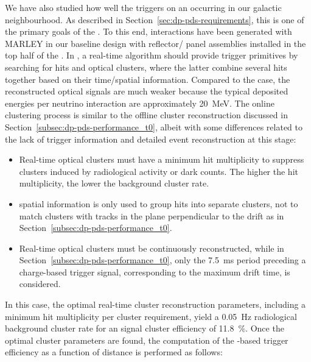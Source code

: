 We have also studied how well the   triggers on an  occurring in our galactic neighbourhood. As described in Section~\ref{sec:dp-pds-requirements}, this is one of the primary goals of the . To this end,  \nue {} interactions have been generated with MARLEY \cite{marley} in our baseline  design with reflector/ panel assemblies installed in the top half of the . In , a real-time algorithm should provide trigger primitives by searching for  hits and optical clusters, where the latter combine several hits together based on their time/spatial information. Compared to the  case, the reconstructed optical signals are much weaker because the typical deposited energies per  neutrino interaction are approximately \SI{20}{\MeV}. The online clustering process is similar to the offline cluster reconstruction discussed in Section~\ref{subsec:dp-pds-performance_t0}, albeit with some differences related to the lack of trigger information and detailed event reconstruction at this stage:
%
\begin{itemize}
\item Real-time optical clusters must have a minimum hit multiplicity to suppress clusters induced by radiological activity or  dark counts. The higher the hit multiplicity, the lower the background cluster rate.
\item {} spatial information is only used to group hits into separate clusters,  not to match  clusters with  tracks in the plane perpendicular to the drift as in Section~\ref{subsec:dp-pds-performance_t0}.
\item Real-time optical clusters must be continuously reconstructed, while in Section~\ref{subsec:dp-pds-performance_t0}, only the \SI{7.5}{\milli\s} period preceding a charge-based trigger signal, corresponding to the maximum drift time, is considered.
\end{itemize}
%
In this case, the optimal real-time cluster reconstruction parameters, including a minimum hit multiplicity per cluster requirement, yield a \SI{0.05}{\Hz} radiological background cluster rate for an  \nue {} signal cluster efficiency of \SI{11.8}{\%}. Once the optimal cluster parameters are found, the computation of the -based  trigger efficiency as a function of  distance is performed as follows:

